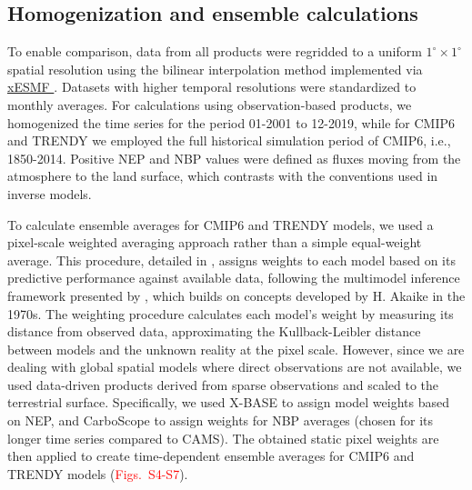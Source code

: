 \documentclass[ProofPDF]{./Styles/Jnls-Template-V3}
\begin{document}

\subsection{Homogenization and ensemble calculations}
To enable comparison, data from all products were regridded to a uniform $1^\circ\times1^\circ$ spatial resolution using the bilinear interpolation method implemented via \hyperlink{https://xesmf.readthedocs.io/}{xESMF \citep{zhuang2023}}. Datasets with higher temporal resolutions were standardized to monthly averages. For calculations using observation-based products, we homogenized the time series for the period 01-2001 to 12-2019, while for CMIP6 and TRENDY we employed the full historical simulation period of CMIP6, i.e., 1850-2014. Positive NEP and NBP values were defined as fluxes moving from the atmosphere to the land surface, which contrasts with the conventions used in inverse models.

To calculate ensemble averages for CMIP6 and TRENDY models, we used a pixel-scale weighted averaging approach rather than a simple equal-weight average. This procedure, detailed in \citet{Sierra2025GDM}, assigns weights to each model based on its predictive performance against available data, following the multimodel inference framework presented by \citet{Burnham2002}, which builds on concepts developed by H. Akaike in the 1970s. The weighting procedure calculates each model's weight by measuring its distance from observed data, approximating the Kullback-Leibler distance between models and the unknown reality at the pixel scale. However, since we are dealing with global spatial models where direct observations are not available, we used data-driven products derived from sparse observations and scaled to the terrestrial surface. Specifically, we used X-BASE to assign model weights based on NEP, and CarboScope to assign weights for NBP averages (chosen for its longer time series compared to CAMS). The obtained static pixel weights are then applied to create time-dependent ensemble averages for CMIP6 and TRENDY models (\textcolor{red}{Figs.~S4-S7}).

 
\end{document}
